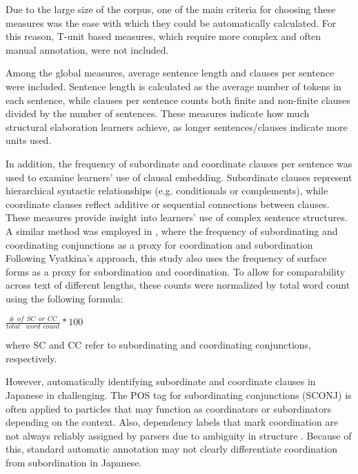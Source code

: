 Due to the large size of the corpus, one of the main criteria for choosing these measures was the ease with which
they could be automatically calculated. For this reason, T-unit based measures, which require more complex and often
manual annotation, were not included.

Among the global measures, average sentence length and clauses per sentence were included. Sentence length is
calculated as the average number of tokens in each sentence, while clauses per sentence counts both finite and
non-finite clauses divided by the number of sentences. These measures indicate how much structural elaboration
learners achieve, as longer sentences/clauses indicate more units used.

In addition, the frequency of subordinate and coordinate clauses per sentence was used to examine learners' use of
clausal embedding.
Subordinate clauses represent hierarchical syntactic relationships (e.g. conditionals or complements),
while coordinate clauses reflect additive or sequential connections between clauses. These measures provide insight
into learners'
use of complex sentence structures. A similar method was employed in \citet{Vyatkina2012}, where the frequency of
subordinating and
coordinating conjunctions as a proxy for coordination and subordination
Following Vyatkina's approach, this study also uses the frequency of surface forms as a proxy for subordination and
coordination. To
allow for comparability across text of different lengths, these counts were normalized by total word count using the
following formula:
\begin{center}
${\displaystyle \frac{\# \hspace{5pt} of \hspace{5pt}SC \hspace{5pt}or \hspace{5pt}CC}{total \hspace{5pt} \hspace{
5pt}word \hspace{5pt}count} }  * 100$
\end{center}
where SC and CC refer to subordinating and coordinating conjunctions, respectively.

However, automatically identifying subordinate and coordinate clauses in Japanese in challenging. The POS tag for
subordinating conjunctions (SCONJ) is often applied to particles that may function as coordinators or subordinators
depending on the context. Also, dependency labels that mark coordination are not always reliably assigned by parsers
due to ambiguity in structure \citep{UDJapanese}. Because of this, standard automatic annotation may not clearly
differentiate coordination from subordination in Japanese.

